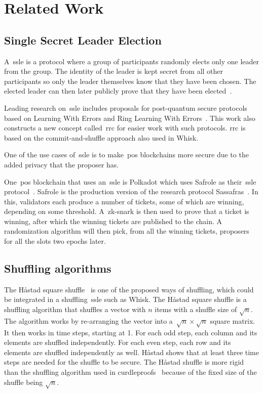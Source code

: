 \section{Related Work}\label{sec:related-work}




\subsection{Single Secret Leader Election}\label{sec:related-work-SSLE}
A~\gls{ssle} is a protocol where a group of participants randomly elects only one leader from the group.
The identity of the leader is kept secret from all other participants so only the leader themselves know that they have been chosen.
The elected leader can then later publicly prove that they have been elected~\cite{10.1145/3419614.3423258}.

Leading research on~\gls{ssle} includes proposals for post-quantum secure protocols based on Learning With Errors and Ring Learning With Errors~\cite{cryptoeprint:2023/1241}.
This work also constructs a new concept called~\gls{rrc} for easier work with such protocols.
\gls{rrc} is based on the commit-and-shuffle approach also used in Whisk.

One of the use cases of~\gls{ssle} is to make~\gls{pos} blockchains more secure due to the added privacy that the proposer has.

One~\gls{pos} blockchain that uses an~\gls{ssle} is Polkadot which uses Safrole as their~\gls{ssle} protocol~\cite{safrole}.
Safrole is the production version of the research protocol Sassafras~\cite{sassafras}.
In this, validators each produce a number of tickets, some of which are winning, depending on some threshold.
A~\gls{zk-snark} is then used to prove that a ticket is winning, after which the winning tickets are published to the chain.
A randomization algorithm will then pick, from all the winning tickets, proposers for all the slots two epochs later.



\subsection{Shuffling algorithms}\label{subsec:related-work-shuffling-algorithm}

The Håstad square shuffle~\cite{haastad2006square} is one of the proposed ways of shuffling, which could be integrated in a shuffling~\gls{ssle} such as Whisk.
The Håstad square shuffle is a shuffling algorithm that shuffles a vector with $n$ items with a shuffle size of $\sqrt {n}$.
The algorithm works by re-arranging the vector into a~$\sqrt{n}\times\sqrt{n}$ square matrix.
It then works in time steps, starting at 1.
For each odd step, each column and its elements are shuffled independently.
For each even step, each row and its elements are shuffled independently as well.
Håstad shows that at least three time steps are needed for the shuffle to be secure.
The Håstad shuffle is more rigid than the shuffling algorithm used in curdleproofs~\cite{cryptoeprint:2022/560} because of the fixed size of the shuffle being $\sqrt{n}$.

